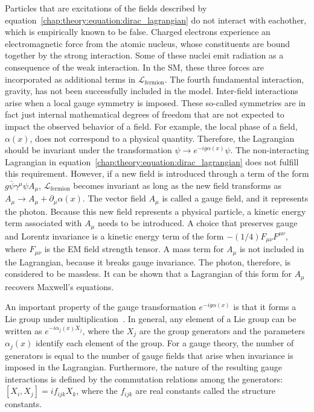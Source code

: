 Particles that are excitations of the fields described by
equation~\ref{chap:theory:equation:dirac_lagrangian} do not interact
with eachother, which is empirically known to be false. Charged
electrons experience an electromagnetic force from the atomic nucleus,
whose constituents are bound together by the strong interaction. Some
of these nuclei emit radiation as a consequence of the weak interaction. In the
SM, these three forces are incorporated as additional terms in
$\mathcal{L}_{\textrm{fermion}}$. The fourth fundamental interaction,
gravity, has not been successfully included in the model. Inter-field
interactions arise when a local gauge symmetry is imposed. These
so-called symmetries are in fact just internal mathematical degrees of
freedom that are not expected to impact the observed behavior of a field. For
example, the local phase of a field, $\alpha(x)$, does not correspond
to a physical quantity. Therefore, the Lagrangian should be
invariant under the transformation $\psi\rightarrow
e^{-ig\alpha(x)}\psi$. The non-interacting Lagrangian
in equation~\ref{chap:theory:equation:dirac_lagrangian} does not fulfill this
requirement. However, if a new field is introduced through a
term of the form $g\bar{\psi}\gamma^{\mu}\psi A_{\mu}$,
$\mathcal{L}_{\textrm{fermion}}$ becomes invariant as long as the new
field transforms as $A_{\mu}\rightarrow{A_{\mu}
+ \partial_{\mu}\alpha(x)}$. The vector field
$A_{\mu}$ is called a gauge field, and it represents the photon. 
Because this new field represents a
physical particle, a kinetic energy term associated with $A_{\mu}$
needs to be introduced. A choice that preserves gauge and Lorentz
invariance is a kinetic energy term of the form $-(1/4)F_{\mu\nu}F^{\mu\nu}$,
where $F_{\mu\nu}$ is the EM field strength tensor. A mass term for $A_{\mu}$ is not included in the
Lagrangian, because it breaks gauge invariance. The photon, therefore,
is considered to be massless. It can be shown
that a Lagrangian of this form for $A_{\mu}$ recovers Maxwell's
equations.

An important property of the gauge transformation
$e^{-ig\alpha(x)}$ is that it forms a Lie group under
multiplication~\cite{}. In general, any element of a Lie group can be
written as $e^{-i\alpha_j(x)X_j}$, where the $X_j$ are the group
generators and the parameters $\alpha_j(x)$ identify each element of the
group. For a gauge theory, the number of generators is equal to the
number of gauge fields that arise when invariance is imposed in the
Lagrangian. Furthermore, the nature of the resulting gauge interactions is defined
by the commutation relations among the generators:
$\left[X_i,X_j\right] = if_{ijk}X_k$, where the $f_{ijk}$ are real
constants called the structure constants.

